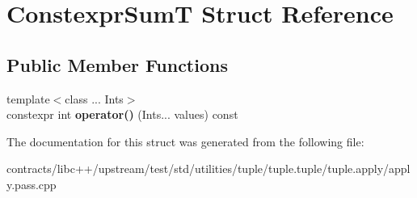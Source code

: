 \hypertarget{struct_constexpr_sum_t}{}\section{Constexpr\+SumT Struct Reference}
\label{struct_constexpr_sum_t}
\subsection*{Public Member Functions}
\begin{DoxyCompactItemize}
\item 
\mbox{\label{struct_constexpr_sum_t_a929fdf7d489900dda4530f8b0bb664fd}} 
{\footnotesize template$<$class ... Ints$>$ }\\constexpr int {\bfseries operator()} (Ints... values) const
\end{DoxyCompactItemize}


The documentation for this struct was generated from the following file\+:\begin{DoxyCompactItemize}
\item 
contracts/libc++/upstream/test/std/utilities/tuple/tuple.\+tuple/tuple.\+apply/apply.\+pass.\+cpp\end{DoxyCompactItemize}
